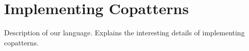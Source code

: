 \section{Implementing Copatterns}
\label{sec:implementing-copatterns}
Description of our language.
Explains the interesting details of implementing copatterns.
